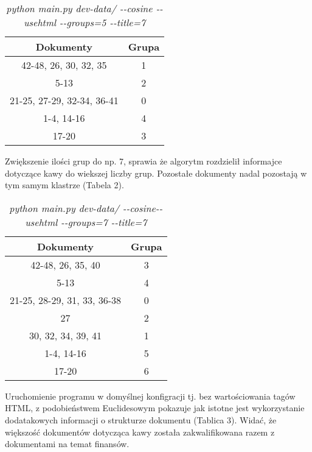 \documentclass{article}
\begin{document}
\begin{table}[h]
\begin{center}
\begin{tabular}{ | c | c | }
\hline
Dokumenty & Grupa \\ \hline
42-48, 26, 30, 32, 35 & 1 \\ \hline
5-13 & 2 \\ \hline
21-25, 27-29, 32-34, 36-41 & 0 \\ \hline
1-4, 14-16 & 4 \\ \hline
17-20 & 3 \\ \hline
\end{tabular}
\end{center}
\caption{\emph{python main.py dev-data/ -{}-cosine -{}-usehtml -{}-groups=5  -{}-title=7}}
\end{table}

Zwiększenie ilości grup do np. 7, sprawia że algorytm rozdzielił informajce dotyczące kawy do wiekszej liczby grup. Pozostałe dokumenty nadal pozostają w tym samym klastrze (Tabela 2).

\begin{table}[h]
\begin{center}
\begin{tabular}{ | c | c | }
\hline
Dokumenty & Grupa \\ \hline
42-48, 26, 35, 40 & 3 \\ \hline
5-13 & 4 \\ \hline
21-25, 28-29, 31, 33, 36-38 & 0 \\ \hline
27 & 2 \\ \hline
30, 32, 34, 39, 41 & 1 \\ \hline
1-4, 14-16 & 5 \\ \hline
17-20 & 6 \\ \hline
\end{tabular}
\caption{\emph{python main.py dev-data/ -{}-cosine-{}-usehtml -{}-groups=7 -{}-title=7}}
\end{center}
\end{table}

Uruchomienie programu w domyślnej konfigracji tj. bez wartościowania tagów HTML, z podobieństwem Euclidesowym pokazuje jak istotne jest wykorzystanie dodatakowych informacji o strukturze dokumentu (Tablica 3). Widać, że większość dokumentów dotycząca kawy została zakwalifikowana razem z dokumentami na temat finansów.
\end{document}
